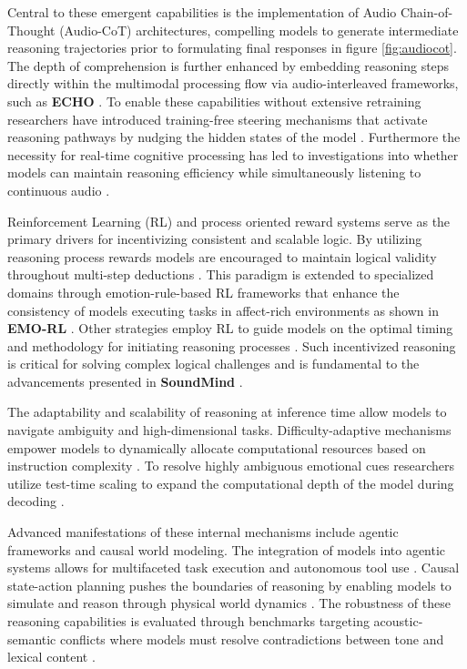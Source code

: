 \documentclass{llmxive}
\begin{document}
Central to these emergent capabilities is the implementation of Audio Chain-of-Thought (Audio-CoT) architectures, compelling models to generate intermediate reasoning trajectories prior to formulating final responses \cite{xiong2025thinking} in figure \ref{fig:audiocot}. The depth of comprehension is further enhanced by embedding reasoning steps directly within the multimodal processing flow via audio-interleaved frameworks, such as \textbf{ECHO} \cite{wu2026echo}. To enable these capabilities without extensive retraining researchers have introduced training-free steering mechanisms that activate reasoning pathways by nudging the hidden states of the model \cite{ieong2026nudging}. Furthermore the necessity for real-time cognitive processing has led to investigations into whether models can maintain reasoning efficiency while simultaneously listening to continuous audio \cite{shih2025can}.

Reinforcement Learning (RL) and process oriented reward systems serve as the primary drivers for incentivizing consistent and scalable logic. By utilizing reasoning process rewards models are encouraged to maintain logical validity throughout multi-step deductions \cite{fan2025incentivizing}. This paradigm is extended to specialized domains through emotion-rule-based RL frameworks that enhance the consistency of models executing tasks in affect-rich environments as shown in \textbf{EMO-RL} \cite{li2025emo}. Other strategies employ RL to guide models on the optimal timing and methodology for initiating reasoning processes \cite{wu2025audio}. Such incentivized reasoning is critical for solving complex logical challenges and is fundamental to the advancements presented in \textbf{SoundMind} \cite{diao2025soundmind}.

The adaptability and scalability of reasoning at inference time allow models to navigate ambiguity and high-dimensional tasks. Difficulty-adaptive mechanisms empower models to dynamically allocate computational resources based on instruction complexity \cite{sheng2025think}. To resolve highly ambiguous emotional cues researchers utilize test-time scaling to expand the computational depth of the model during decoding \cite{jia2026decoding}.

Advanced manifestations of these internal mechanisms include agentic frameworks and causal world modeling. The integration of models into agentic systems allows for multifaceted task execution and autonomous tool use \cite{wijngaard2025audiotoolagent}. Causal state-action planning pushes the boundaries of reasoning by enabling models to simulate and reason through physical world dynamics \cite{zhou2025speech} . The robustness of these reasoning capabilities is evaluated through benchmarks targeting acoustic-semantic conflicts where models must resolve contradictions between tone and lexical content \cite{huang2026tone}. 
\end{document}
